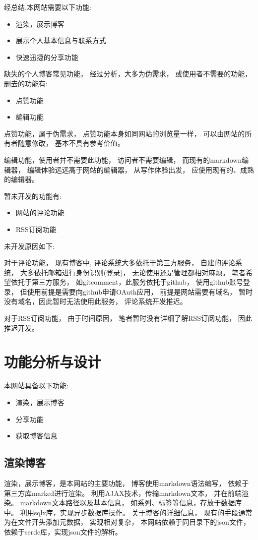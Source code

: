 \documentclass[12pt]{ctexart}
\begin{document}
经总结,本网站需要以下功能:
\begin{itemize}
	\item 渲染，展示博客
	\item 展示个人基本信息与联系方式
	\item 快速迅捷的分享功能
\end{itemize}

缺失的个人博客常见功能，
经过分析，大多为伪需求，
或使用者不需要的功能，
删去的功能有:
\begin{itemize}
	\item 点赞功能
  \item 编辑功能
\end{itemize}

点赞功能，属于伪需求，
点赞功能本身如同网站的浏览量一样，
可以由网站的所有者随意修改，
基本不具有参考价值。

编辑功能，使用者并不需要此功能，
访问者不需要编辑，
而现有的markdown编辑器，
编辑体验远远高于网站的编辑器，
从写作体验出发，
应使用现有的、成熟的编辑器。

暂未开发的功能有:
\begin{itemize}
  \item 网站的评论功能
  \item RSS订阅功能
\end{itemize}

未开发原因如下:

对于评论功能，
现有博客中,
评论系统大多依托于第三方服务，
自建的评论系统，
大多依托邮箱进行身份识别(登录)，
无论使用还是管理都相对麻烦。
笔者希望依托于第三方服务，
如gitcomment，此服务依托于github，
使用github账号登录，
但使用前提是需要向github申请OAuth应用，
前提是网站需要有域名，
暂时没有域名，因此暂时无法使用此服务，
评论系统开发推迟。

对于RSS订阅功能，
由于时间原因，
笔者暂时没有详细了解RSS订阅功能，
因此推迟开发。

\section{功能分析与设计}

本网站具备以下功能:
\begin{itemize}
	\item 渲染，展示博客
	\item 分享功能
  \item 获取博客信息
\end{itemize}

\subsection{渲染博客}
渲染，展示博客，是本网站的主要功能，
博客使用markdown语法编写，
依赖于第三方库marked进行渲染。
利用AJAX技术，传输markdown文本，
并在前端渲染。
markdown文本路径以及基本信息，
如系列、标签等信息，存放于数据库中。
利用sqlx库，实现异步数据库操作。
关于博客的详细信息，
现有的手段通常为在文件开头添加元数据，
实现相对复杂，
本网站依赖于同目录下的json文件，
依赖于serde库，实现json文件的解析。
\end{document}
